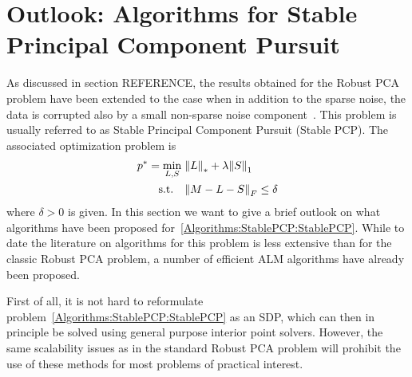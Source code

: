 \documentclass{../../common/projectreport}
\begin{document}
\section{Outlook: Algorithms for Stable Principal Component Pursuit}
\label{Algorithms:StablePCP:Sec}

As discussed in section REFERENCE, the results obtained for the Robust PCA problem have been extended to the case when in addition to the sparse noise, the data is corrupted also by a small non-sparse noise component~\cite{Zhou:2010vn}. This problem is usually referred to as Stable Principal Component Pursuit (Stable PCP). The associated optimization problem is 
%
\begin{align}
\begin{split}
p^* = \min_{L,S} \; &{\left\|L\right\|}_{*}^{} + \lambda {\left\|S\right\|}_{1}^{} \\
\text{s.t.} \quad &{\left\|M - L - S\right\|}_{F}^{} \leq \delta
\end{split}
\label{Algorithms:StablePCP:StablePCP}
\end{align}
%
where $\delta>0$ is given. In this section we want to give a brief outlook on what algorithms have been proposed for~\eqref{Algorithms:StablePCP:StablePCP}. While to date the literature on algorithms for this problem is less extensive than for the classic Robust PCA problem, a number of efficient ALM algorithms have already been proposed. 

First of all, it is not hard to reformulate problem~\eqref{Algorithms:StablePCP:StablePCP} as an SDP, which can then in principle be solved using general purpose interior point solvers. However, the same scalability issues as in the standard Robust PCA problem will prohibit the use of these methods for most problems of practical interest.
\end{document}
